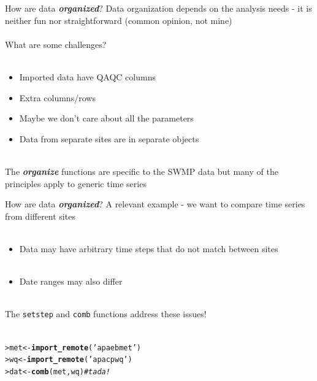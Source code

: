 \documentclass[serif]{beamer}\usepackage[]{graphicx}\usepackage[]{color}
\makeatletter
\newcommand{\hlstr}[1]{\textcolor[rgb]{0.192,0.494,0.8}{#1}}%
\newcommand{\hlcom}[1]{\textcolor[rgb]{0.678,0.584,0.686}{\textit{#1}}}%
\newcommand{\hlstd}[1]{\textcolor[rgb]{0.345,0.345,0.345}{#1}}%
\newcommand{\hlkwb}[1]{\textcolor[rgb]{0.69,0.353,0.396}{#1}}%
\newcommand{\hlkwd}[1]{\textcolor[rgb]{0.737,0.353,0.396}{\textbf{#1}}}%
\newenvironment{kframe}{%
 \def\at@end@of@kframe{}%
 \ifinner\ifhmode%
  \def\at@end@of@kframe{\end{minipage}}%
  \begin{minipage}{\columnwidth}%
 \fi\fi%
 \def\FrameCommand##1{\hskip\@totalleftmargin \hskip-\fboxsep
 \colorbox{shadecolor}{##1}\hskip-\fboxsep
     \hskip-\linewidth \hskip-\@totalleftmargin \hskip\columnwidth}%
 \MakeFramed {\advance\hsize-\width
   \@totalleftmargin\z@ \linewidth\hsize
   \@setminipage}}%
 {\par\unskip\endMakeFramed%
 \at@end@of@kframe}
\newenvironment{knitrout}{}{} %
\newcommand{\Bigtxt}[1]{\textbf{\textit{#1}}}
\makeatother
\begin{document}
\begin{frame}[fragile,t]{How are data \Bigtxt{organized}?}
Data organization depends on the analysis needs - it is neither fun nor straightforward (common opinion, not mine) \\~\\
What are some challenges?\\~\\
\begin{itemize}
\item Imported data have QAQC columns
\item Extra columns/rows
\item Maybe we don't care about all the parameters
\item Data from separate sites are in separate objects \\~\\
\end{itemize}
The \Bigtxt{organize} functions are specific to the SWMP data but many of the principles apply to generic time series
\end{frame}

\begin{frame}[fragile]{How are data \Bigtxt{organized}?}
A relevant example - we want to compare time series from different sites\\~\\
\begin{itemize}
\item Data may have arbitrary time steps that do not match between sites \\~\\
\item Date ranges may also differ \\~\\
\end{itemize}
The \texttt{setstep} and \texttt{comb} functions address these issues! \\~\\
\begin{knitrout}
\color{fgcolor}\begin{kframe}
\begin{alltt}
\hlstd{> }\hlstd{met} \hlkwb{<-} \hlkwd{import_remote}\hlstd{(}\hlstr{'apaebmet'}\hlstd{)}
\hlstd{> }\hlstd{wq} \hlkwb{<-} \hlkwd{import_remote}\hlstd{(}\hlstr{'apacpwq'}\hlstd{)}
\hlstd{> }\hlstd{dat} \hlkwb{<-} \hlkwd{comb}\hlstd{(met, wq)} \hlcom{# tada!}
\end{alltt}
\end{kframe}
\end{knitrout}
\end{frame}
\end{document}
